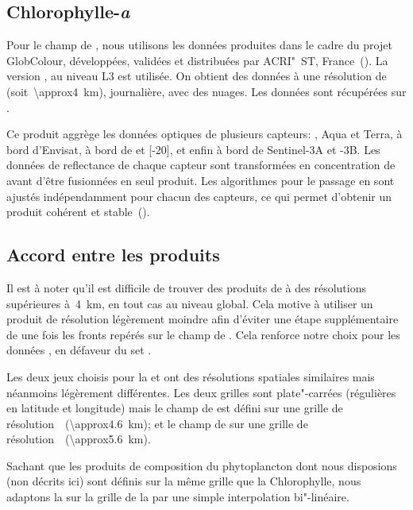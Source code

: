 \subsection{Chlorophylle-\textit{a}}
\label{sec:donnees-chl}

Pour le champ de , nous utilisons les données produites dans le cadre du projet GlobColour, développées, validées et distribuées par ACRI"~ST, France~(\cite{maritorena_2002}).
La version , au niveau L3 est utilisée.
On obtient des données à une résolution de~ (soit~\qty{\approx4}{\km}), journalière, avec des nuages.
Les données sont récupérées sur .

Ce produit aggrège les données optiques de plusieurs capteurs: ,  Aqua et Terra,  à bord d'Envisat,  à bord de  et [-20], et enfin  à bord de Sentinel-3A et -3B.
Les données de reflectance de chaque capteur sont transformées en concentration de  avant d'être fusionnées en seul produit.
Les algorithmes pour le passage en  sont ajustés indépendamment pour chacun des capteurs, ce qui permet d'obtenir un produit cohérent et stable~(\cite{garnesson_2019}).


\subsection{Accord entre les produits}

Il est à noter qu'il est difficile de trouver des produits de  à des résolutions supérieures à~\qty{4}{\km}, en tout cas au niveau global.
Cela motive à utiliser un produit  de résolution légèrement moindre afin d'éviter une étape supplémentaire de  une fois les fronts repérés sur le champ de .
Cela renforce notre choix pour les données , en défaveur du set .

Les deux jeux choisis pour la  et  ont des résolutions spatiales similaires mais néanmoins légèrement différentes.
Les deux grilles sont plate"-carrées (régulières en latitude et longitude) mais le champ de  est défini sur une grille  de résolution~~(\qty{\approx4.6}{\km}); et le champ de  sur une grille  de résolution~~(\qty{\approx5.6}{\km}).

Sachant que les produits de composition du phytoplancton dont nous disposions (non décrits ici) sont définis sur la même grille que la Chlorophylle, nous adaptons la  sur la grille de la  par une simple interpolation bi"-linéaire.


